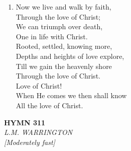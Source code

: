 \documentclass[11pt,a4paper]{article}
\begin{document}
\begin{enumerate}
    \item Now we live and walk by faith, \\
        Through the love of Christ; \\
        We can triumph over death, \\
        One in life with Christ. \\
        Rooted, settled, knowing more, \\
        Depths and heights of love explore, \\
        Till we gain the heavenly shore \\
        Through the love of Christ. \\
        Love of Christ! \\
        When He comes we then shall know \\
        All the love of Christ.

\end{enumerate}

\newpage
\begin{center}
    {\Large \textbf{HYMN 311}}
    \\
    \textit{L.M. WARRINGTON}
    \\
    \textit{\small [Moderately fast]}
\end{center}
\vspace{1em}
\end{document}
